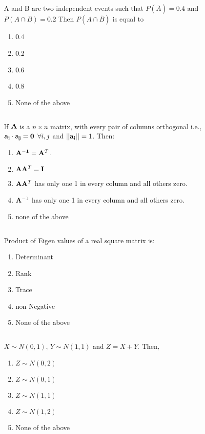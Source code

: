 \begin{frame}
\section{}
A and B are two independent events such that $P(\overline A) = 0.4$ and $P(A \cap B) = 0.2$ Then $P(A \cap \overline B)$ is equal to
\begin{enumerate}
\item 0.4   %
\item 0.2
\item 0.6
\item 0.8
\item None of  the above
\end{enumerate}
\end{frame}

\begin{frame}
\section{}
If ${\bf A}$ is a $n\times n$ matrix, with every pair of columns orthogonal i.e., ${\bf a_i\cdot a_j = 0}\,\,\, \forall i,j$ and $||{\bf a_i}|| = 1$. Then:
\begin{enumerate}
\item ${\bf A^{-1}} = {\bf A}^T$.   %
\item ${\bf A}{\bf A}^T = {\bf I}$    %
\item ${\bf A}{\bf A}^T$ has only one 1 in every column and all others zero.
\item ${\bf A}^{-1}$ has only one 1 in every column and all others zero.
\item none of the above
\end{enumerate}
\end{frame}

\begin{frame}
\section{}
Product of Eigen values of a real square matrix is:
\begin{enumerate}
\item Determinant   %
\item Rank
\item Trace
\item non-Negative
\item None of the above
\end{enumerate}
\end{frame}

\begin{frame}
\section{}
$X\sim N(0,1)$, $Y\sim N(1,1)$ and $Z=X+Y$. Then,
\begin{enumerate}
\item $Z\sim N(0,2)$
\item $Z\sim N(0,1)$
\item $Z\sim N(1,1)$
\item $Z\sim N(1,2)$    %
\item None of the above
\end{enumerate}
\end{frame}

